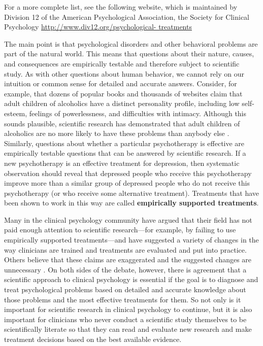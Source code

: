 For a more complete list, see the following website, which is maintained by Division 12 of the American Psychological Association, the Society for Clinical Psychology  \url{http://www.div12.org/psychological- treatments}



The main point is that psychological disorders and other behavioral problems are part of the natural world. This means that questions about their nature, causes, and consequences are empirically testable and therefore subject to scientific study. As with other questions about human behavior, we cannot rely on our intuition or common sense for detailed and accurate answers. Consider, for example, that dozens of popular books and thousands of websites claim that adult children of alcoholics have a distinct personality profile, including low self-esteem, feelings of powerlessness, and difficulties with intimacy. Although this sounds plausible, scientific research has demonstrated that adult children of alcoholics are no more likely to have these problems than anybody else \citep{lilienfeld_50_2011}. Similarly, questions about whether a particular psychotherapy is effective are empirically testable questions that can be answered by scientific research. If a new psychotherapy is an effective treatment for depression, then systematic observation should reveal that depressed people who receive this psychotherapy improve more than a similar group of depressed people who do not receive this psychotherapy (or who receive some alternative treatment). Treatments that have been shown to work in this way are called \textbf{empirically supported treatments}.

Many in the clinical psychology community have argued that their field has not paid enough attention to scientific research---for example, by failing to use empirically supported treatments---and have suggested a variety of changes in the way clinicians are trained and treatments are evaluated and put into practice. Others believe that these claims are exaggerated and the suggested changes are unnecessary \citep{norcross_evidence-based_2006}. On both sides of the debate, however, there is agreement that a scientific approach to clinical psychology is essential if the goal is to diagnose and treat psychological problems based on detailed and accurate knowledge about those problems and the most effective treatments for them. So not only is it important for scientific research in clinical psychology to continue, but it is also important for clinicians who never conduct a scientific study themselves to be scientifically literate so that they can read and evaluate new research and make treatment decisions based on the best available evidence.

